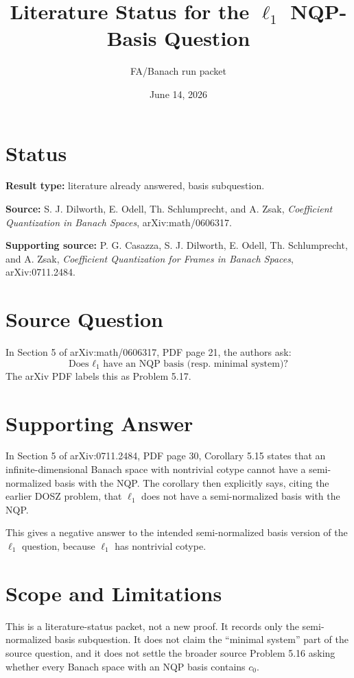 \documentclass[11pt]{article}
\title{Literature Status for the \(\ell_1\) NQP-Basis Question}
\author{FA/Banach run packet}
\date{June 14, 2026}
\begin{document}
\maketitle

\section*{Status}

\textbf{Result type:} literature already answered, basis subquestion.

\textbf{Source:} S. J. Dilworth, E. Odell, Th. Schlumprecht, and A. Zsak,
\emph{Coefficient Quantization in Banach Spaces}, arXiv:math/0606317.

\textbf{Supporting source:} P. G. Casazza, S. J. Dilworth, E. Odell,
Th. Schlumprecht, and A. Zsak, \emph{Coefficient Quantization for Frames in
Banach Spaces}, arXiv:0711.2484.

\section*{Source Question}

In Section 5 of arXiv:math/0606317, PDF page 21, the authors ask:
\[
\text{Does }\ell_1\text{ have an NQP basis (resp. minimal system)?}
\]
The arXiv PDF labels this as Problem 5.17.

\section*{Supporting Answer}

In Section 5 of arXiv:0711.2484, PDF page 30, Corollary 5.15 states that an
infinite-dimensional Banach space with nontrivial cotype cannot have a
semi-normalized basis with the NQP. The corollary then explicitly says, citing
the earlier DOSZ problem, that \(\ell_1\) does not have a semi-normalized basis
with the NQP.

This gives a negative answer to the intended semi-normalized basis version of
the \(\ell_1\) question, because \(\ell_1\) has nontrivial cotype.

\section*{Scope and Limitations}

This is a literature-status packet, not a new proof. It records only the
semi-normalized basis subquestion. It does not claim the ``minimal system''
part of the source question, and it does not settle the broader source Problem
5.16 asking whether every Banach space with an NQP basis contains \(c_0\).
\end{document}

